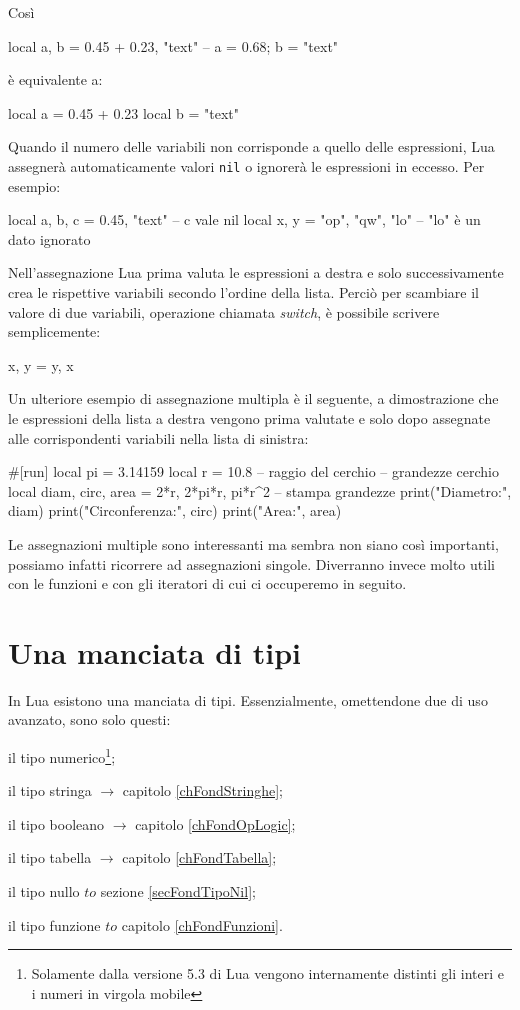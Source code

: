 Così
\begin{lines}
local a, b = 0.45 + 0.23, "text" -- a = 0.68; b = "text"
\end{lines}
è equivalente a:
\begin{lines}
local a = 0.45 + 0.23
local b = "text"
\end{lines}

Quando il numero delle variabili non corrisponde a quello delle espressioni, Lua
assegnerà automaticamente valori \texttt{nil} o ignorerà le espressioni in
eccesso. Per esempio:
\begin{lines}
local a, b, c = 0.45, "text"  -- c vale nil
local x, y = "op", "qw", "lo" -- "lo" è un dato ignorato
\end{lines}

Nell'assegnazione Lua prima valuta le espressioni a destra e solo
successivamente crea le rispettive variabili secondo l'ordine della lista.
Perciò per scambiare il valore di due variabili, operazione chiamata
\emph{switch}, è possibile scrivere semplicemente:
\begin{lines}
x, y = y, x
\end{lines}

Un ulteriore esempio di assegnazione multipla è il seguente, a dimostrazione
che le espressioni della lista a destra vengono prima valutate e solo dopo
assegnate alle corrispondenti variabili nella lista di sinistra:
\begin{lines}
#[run]
local pi = 3.14159
local r = 10.8 -- raggio del cerchio
-- grandezze cerchio
local diam, circ, area = 2*r, 2*pi*r, pi*r^2
-- stampa grandezze
print("Diametro:", diam)
print("Circonferenza:", circ)
print("Area:", area)
\end{lines}

Le assegnazioni multiple sono interessanti ma sembra non siano così importanti,
possiamo infatti ricorrere ad assegnazioni singole. Diverranno invece molto
utili con le funzioni e con gli iteratori di cui ci occuperemo in seguito.


\section{Una manciata di tipi}
\label{secFondManciataTipi}

In Lua esistono una manciata di tipi. Essenzialmente, omettendone due di uso
avanzato, sono solo questi:
\begin{compactitemize}
\item {} il tipo numerico\footnote{Solamente dalla versione 5.3 di Lua
vengono internamente distinti gli interi e i numeri in virgola mobile};
\item {} il tipo stringa \( \to \) capitolo \ref{chFondStringhe};
\item {} il tipo booleano \( \to \) capitolo \ref{chFondOpLogic};
\item {} il tipo tabella \( \to \) capitolo \ref{chFondTabella};
\item {} il tipo nullo \( to \) sezione \ref{secFondTipoNil};
\item {} il tipo funzione \( to \) capitolo \ref{chFondFunzioni}.
\end{compactitemize}

